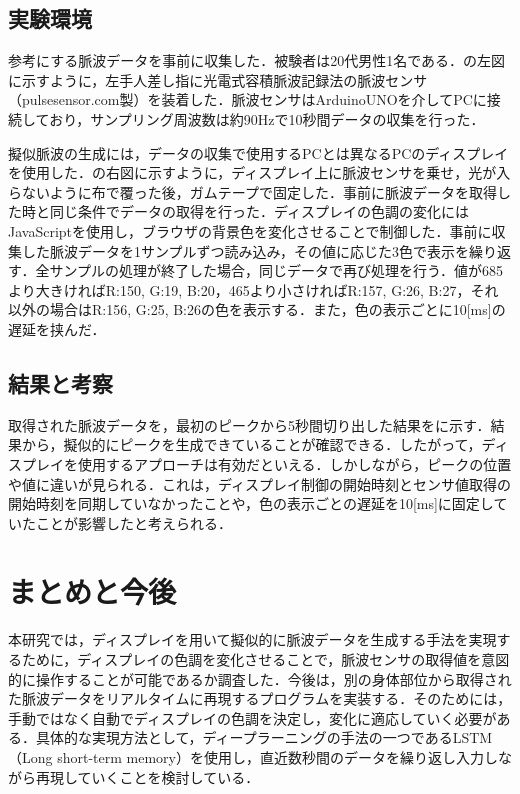 \documentclass[submit,techrep]{ipsj}
\begin{document}
\subsection{実験環境}
参考にする脈波データを事前に収集した．被験者は20代男性1名である．の左図に示すように，左手人差し指に光電式容積脈波記録法の脈波センサ（pulsesensor.com製）を装着した．脈波センサはArduinoUNOを介してPCに接続しており，サンプリング周波数は約90Hzで10秒間データの収集を行った．
\par

擬似脈波の生成には，データの収集で使用するPCとは異なるPCのディスプレイを使用した．の右図に示すように，ディスプレイ上に脈波センサを乗せ，光が入らないように布で覆った後，ガムテープで固定した．事前に脈波データを取得した時と同じ条件でデータの取得を行った．ディスプレイの色調の変化にはJavaScriptを使用し，ブラウザの背景色を変化させることで制御した．事前に収集した脈波データを1サンプルずつ読み込み，その値に応じた3色で表示を繰り返す．全サンプルの処理が終了した場合，同じデータで再び処理を行う．値が685より大きければR:150, G:19, B:20，465より小さければR:157, G:26, B:27，それ以外の場合はR:156, G:25, B:26の色を表示する．また，色の表示ごとに10[ms]の遅延を挟んだ．

\subsection{結果と考察}
取得された脈波データを，最初のピークから5秒間切り出した結果をに示す．結果から，擬似的にピークを生成できていることが確認できる．したがって，ディスプレイを使用するアプローチは有効だといえる．しかしながら，ピークの位置や値に違いが見られる．これは，ディスプレイ制御の開始時刻とセンサ値取得の開始時刻を同期していなかったことや，色の表示ごとの遅延を10[ms]に固定していたことが影響したと考えられる．


\section{まとめと今後}
本研究では，ディスプレイを用いて擬似的に脈波データを生成する手法を実現するために，ディスプレイの色調を変化させることで，脈波センサの取得値を意図的に操作することが可能であるか調査した．今後は，別の身体部位から取得された脈波データをリアルタイムに再現するプログラムを実装する．そのためには，手動ではなく自動でディスプレイの色調を決定し，変化に適応していく必要がある．具体的な実現方法として，ディープラーニングの手法の一つであるLSTM（Long short-term memory）を使用し，直近数秒間のデータを繰り返し入力しながら再現していくことを検討している．
\end{document}
